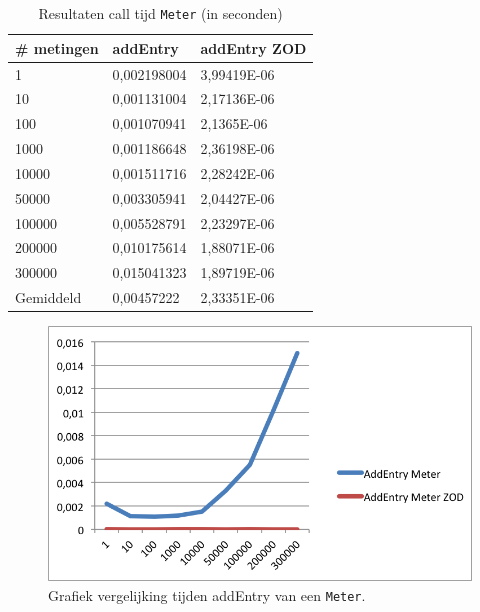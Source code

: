 \begin{table}[]
\centering
\begin{tabular}{|l|l|l|}
\hline
\# metingen & addEntry    & addEntry ZOD \\ \hline
1           & 0,002198004 & 3,99419E-06  \\ \hline
10          & 0,001131004 & 2,17136E-06  \\ \hline
100         & 0,001070941 & 2,1365E-06   \\ \hline
1000        & 0,001186648 & 2,36198E-06  \\ \hline
10000       & 0,001511716 & 2,28242E-06  \\ \hline
50000       & 0,003305941 & 2,04427E-06  \\ \hline
100000      & 0,005528791 & 2,23297E-06  \\ \hline
200000      & 0,010175614 & 1,88071E-06  \\ \hline
300000      & 0,015041323 & 1,89719E-06  \\ \hline
Gemiddeld   & 0,00457222  & 2,33351E-06  \\ \hline
\end{tabular}
\caption{Resultaten call tijd \texttt{Meter} (in seconden)}
\label{Table:Meter}
\end{table}

\begin{figure}[!h]
  \centering
  \includegraphics[scale=1.0]{Afbeeldingen/Evaluatie/AddEntryMeter}
  \caption{Grafiek vergelijking tijden addEntry van een \texttt{Meter}.}
  \label{fig:GraphMeter}
\end{figure}



